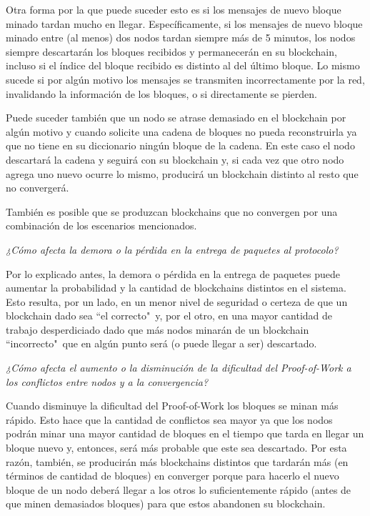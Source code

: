 Otra forma por la que puede suceder esto es si los mensajes de nuevo bloque minado tardan mucho en llegar. Específicamente, si los mensajes de nuevo bloque minado entre (al menos) dos nodos tardan siempre más de 5 minutos, los nodos siempre descartarán los bloques recibidos y permanecerán en su blockchain, incluso si el índice del bloque recibido es distinto al del último bloque. Lo mismo sucede si por algún motivo los mensajes se transmiten incorrectamente por la red, invalidando la información de los bloques, o si directamente se pierden.

Puede suceder también que un nodo se atrase demasiado en el blockchain por algún motivo y cuando solicite una cadena de bloques no pueda reconstruirla ya que no tiene en su diccionario ningún bloque de la cadena. En este caso el nodo descartará la cadena y seguirá con su blockchain y, si cada vez que otro nodo agrega uno nuevo ocurre lo mismo, producirá un blockchain distinto al resto que no convergerá.

También es posible que se produzcan blockchains que no convergen por una combinación de los escenarios mencionados.

\emph{¿Cómo afecta la demora o la pérdida en la entrega de paquetes al protocolo?}

Por lo explicado antes, la demora o pérdida en la entrega de paquetes puede aumentar la probabilidad y la cantidad de blockchains distintos en el sistema. Esto resulta, por un lado, en un menor nivel de seguridad o certeza de que un blockchain dado sea ``el correcto"\ y, por el otro, en una mayor cantidad de trabajo desperdiciado dado que más nodos minarán de un blockchain ``incorrecto"\ que en algún punto será (o puede llegar a ser) descartado.

\emph{¿Cómo afecta el aumento o la disminución de la dificultad del Proof-of-Work a los conflictos entre nodos y a la convergencia?}

Cuando disminuye la dificultad del Proof-of-Work los bloques se minan más rápido. Esto hace que la cantidad de conflictos sea mayor ya que los nodos podrán minar una mayor cantidad de bloques en el tiempo que tarda en llegar un bloque nuevo y, entonces, será más probable que este sea descartado. Por esta razón, también, se producirán más blockchains distintos que tardarán más (en términos de cantidad de bloques) en converger porque para hacerlo el nuevo bloque de un nodo deberá llegar a los otros lo suficientemente rápido (antes de que minen demasiados bloques) para que estos abandonen su blockchain.

